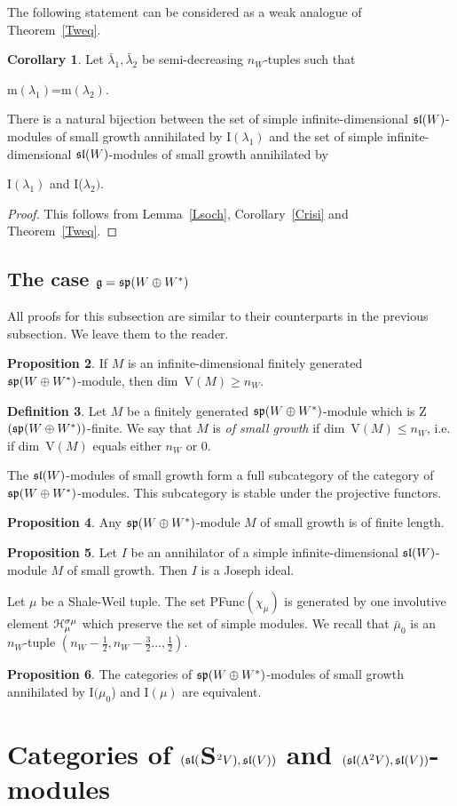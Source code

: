 \documentclass[12pt]{amsart}
\theoremstyle{definition}\newtheorem{theorem}{Theorem}[section]
\newtheorem{proposition}{Proposition}[section]
\newtheorem{corollary}[proposition]{Corollary}
\theoremstyle{definition}\newtheorem{definition}[proposition]{Definition}
\theoremstyle{remark}\newtheorem{example}[proposition]{Example}
\begin{document}
The following statement can be considered as a weak analogue of Theorem~\ref{Tweq}.
\begin{corollary}\label{Cii} Let $\bar\lambda_1, \bar\lambda_2$ be semi-decreasing $n_W$-tuples such that\begin{center}m$(\lambda_1)$=m$(\lambda_2)$.\end{center} There is a natural bijection between the set of simple infinite-dimensional $\frak{sl}(W)$-modules of small growth annihilated by I$(\lambda_1)$ and the set of simple infinite-dimensional $\frak{sl}(W)$-modules of small growth annihilated by \begin{center}I$(\lambda_1)$ and I($\lambda_2)$.\end{center}\end{corollary}
\begin{proof}This follows from Lemma~\ref{Lsoch}, Corollary~\ref{Crisi} and Theorem~\ref{Tweq}.\end{proof}
\subsection{The case $\frak g=\frak{sp}(W\oplus W^*)$} All proofs for this subsection are similar to their counterparts in the previous subsection. We leave them to the reader.
\begin{proposition}If $M$ is an infinite-dimensional finitely generated\\ $\frak{sp}(W\oplus W^*)$-module, then dim~V$(M)\ge n_W$.\end{proposition}
\begin{definition}Let $M$ be a finitely generated $\frak{sp}(W\oplus W^*)$-module which is Z$(\frak{sp}(W\oplus W^*))$-finite. We say that $M$ is {\it of small growth} if dim~V$(M)\le n_W$, i.e. if dim~V$(M)$ equals either $n_W$ or 0.\end{definition}
The $\frak{sl}(W)$-modules of small growth form a full subcategory of the category of $\frak{sp}(W\oplus W^*)$-modules. This subcategory is stable under the projective functors.
\begin{proposition}Any $\frak{sp}(W\oplus W^*)$-module $M$ of small growth is of finite length.\end{proposition}
\begin{proposition} Let $I$ be an annihilator of a simple infinite-dimensional $\frak{sl}(W)$-module $M$ of small growth. Then $I$ is a Joseph ideal.\end{proposition}
Let $\mu$ be a Shale-Weil tuple. The set PFunc$(\chi_\mu)$ is generated by one involutive element $\EuScript H_\mu^{\sigma\mu}$ which preserve the set of simple modules. We recall that $\bar\mu_0$ is an $n_W$-tuple $(n_W-\frac{1}{2}, n_W-\frac{3}{2}..., \frac{1}{2})$.
\begin{proposition}The categories of $\frak{sp}(W\oplus W^*)$-modules of small growth annihilated by I$(\mu_0$) and I$(\mu)$ are equivalent.\end{proposition}
\newpage\section{Categories of $(\frak{sl}($S$^2V), \frak{sl}(V))$ and $(\frak{sl}(\Lambda^2V), \frak{sl}(V))$-modules}\label{Sbsl}
\end{document}
